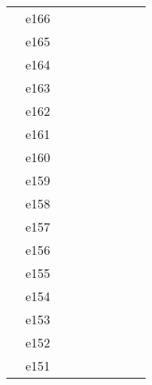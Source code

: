 \documentclass[10pt,letterpaper]{article}
\begin{document}
\begin{center}
\begin{tabular}{ |c|c|c|c|c|c|c|c|c| }
        & e166 &         &                  &            &         &          &                &            \\
        & e165 &         &                  &            &         &          &                &            \\
        & e164 &         &                  &            &         &          &                &            \\
        & e163 &         &                  &            &         &          &                &            \\
        & e162 &         &                  &            &         &          &                &            \\
        & e161 &         &                  &            &         &          &                &            \\
        & e160 &         &                  &            &         &          &                &            \\
        & e159 &         &                  &            &         &          &                &            \\
        & e158 &         &                  &            &         &          &                &            \\
        & e157 &         &                  &            &         &          &                &            \\
        & e156 &         &                  &            &         &          &                &            \\
        & e155 &         &                  &            &         &          &                &            \\
        & e154 &         &                  &            &         &          &                &            \\
        & e153 &         &                  &            &         &          &                &            \\
        & e152 &         &                  &            &         &          &                &            \\
        & e151 &         &                  &            &         &          &                &            \\
        \hline
        \end{tabular}
        \end{center}

    \clearpage
\end{document}
